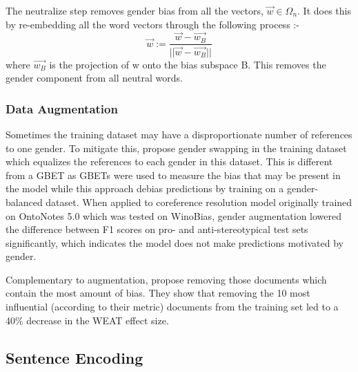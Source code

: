 \documentclass[11pt,a4paper]{article}
\begin{document}
\begin{enumerate}
    The neutralize step removes gender bias from all the vectors, $\vec{w} \in \Omega_n$. It does this by re-embedding all the word vectors through the following process :-
    \[\vec{w} := \frac{\vec{w} - \vec{w_B}}{||\vec{w} - \vec{w_B}||}\]
    where $\vec{w_B}$ is the projection of w onto the bias subspace B. This removes the gender component from all neutral words. 
    
    
    
    \subsubsection{Data Augmentation}
    Sometimes the training dataset may have a disproportionate number of references to one gender. To mitigate this, \citet{zhao-etal-2018-gender} propose gender swapping in the training dataset which equalizes the references to each gender in this dataset. This is different from a GBET as GBETs were used to measure the bias that may be present in the model while this approach debias predictions by training on a gender-balanced dataset. 
    When applied to coreference resolution model originally trained on OntoNotes 5.0 which was tested on WinoBias, gender augmentation lowered the difference between F1 scores on pro- and anti-stereotypical test sets significantly, which indicates the model does not make predictions motivated by gender.
    
    Complementary to augmentation, \citet{pmlr-v97-brunet19a} propose removing those documents which contain the most amount of bias. They show that removing the 10 most influential (according to their metric) documents from the training set led to a 40\% decrease in the WEAT effect size.
    
    \subsection{Sentence Encoding}
    

\end{enumerate}
\end{document}
